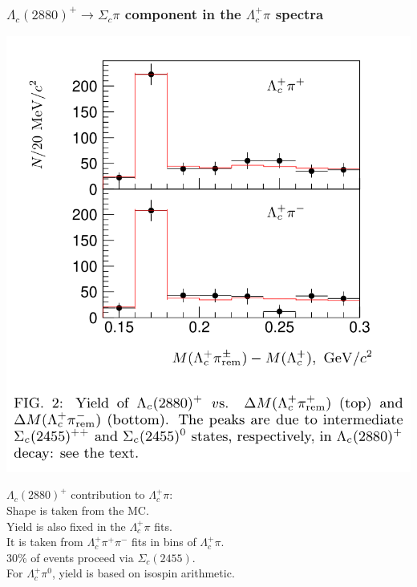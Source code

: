 \documentclass[10pt, aspectratio=169]{beamer}
\def\Lc{{\Lambda_c^+}}
\def\LcIII{{\Lambda_c(2880)^+}}
\def\ScI{{\Sigma_c(2455)}}
\def\Sc{{\Sigma_c}}
\def\pip{{\pi^+}}
\def\pim{{\pi^-}}
\def\piz{{\pi^0}}
\begin{document}
\begin{frame}[label=lcpi-from-lc2880]%
  \frametitle{$\LcIII\to\Sc\pi$ component in the $\Lc\pi$ spectra}
  \centering
  \parbox{.49\linewidth}{
    \includegraphics[height=.85\textheight]{figures/005/fig1-002}
  } \parbox{.49\linewidth}{
    $\LcIII$ contribution to $\Lc\pi$:
    \\[.5ex]
    Shape is taken from the MC.
    \\ \vfill
    Yield is also fixed in the $\Lc\pi$ fits.
    \\[.5ex]
    It is taken from $\Lc\pip\pim$ fits in bins of $\Lc\pi$.
    \\ \vfill
    30\% of events proceed via $\ScI$.
    \\ \vfill
    For $\Lc\piz$, yield is based on isospin arithmetic.
  }
\end{frame}%
\end{document}
